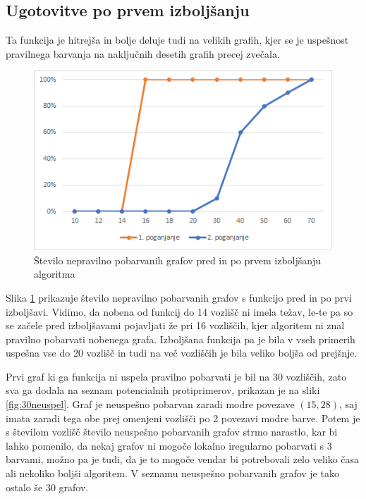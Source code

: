 \documentclass[12pt, a4paper]{article}
\begin{document}
\subsection{Ugotovitve po prvem izboljšanju}

Ta funkcija je hitrejša in bolje deluje tudi na velikih grafih, kjer se je uspešnost pravilnega barvanja na naključnih desetih grafih precej zvečala.

\begin{figure}[H]
  \includegraphics[width=\linewidth]{stevilo_nepravilnih.png}
  \caption{Število nepravilno pobarvanih grafov pred in po prvem izboljšanju algoritma}
  \label{fig:stnepravilnih1}
\end{figure}

Slika \ref{fig:stnepravilnih1} prikazuje število nepravilno pobarvanih grafov s funkcijo pred in po prvi izboljšavi. Vidimo, da nobena od funkcij do 14 vozlišč ni imela težav, le-te pa so se začele pred izboljšavami pojavljati že pri 16 vozliščih, kjer algoritem ni znal pravilno pobarvati nobenega grafa. Izboljšana funkcija pa je bila v vseh primerih uspešna vse do 20 vozlišč in tudi na več vozliščih je bila veliko boljša od prejšnje.

Prvi graf ki ga funkcija ni uspela pravilno pobarvati je bil na 30 vozliščih, zato sva ga dodala na seznam potencialnih protiprimerov, prikazan je na sliki \ref{fig:30neuspel}. Graf je neuspešno pobarvan zaradi modre povezave $(15, 28)$, saj imata zaradi tega obe prej omenjeni vozlišči po 2 povezavi modre barve. Potem je s številom vozlišč  število neuspešno pobarvanih grafov strmo narastlo, kar bi lahko pomenilo, da nekaj grafov ni mogoče lokalno iregularno pobarvati s 3 barvami, možno pa je tudi, da je to mogoče vendar bi potrebovali zelo veliko časa ali nekoliko boljši algoritem. V seznamu neuspešno pobarvanih grafov je tako ostalo še 30 grafov.
\end{document}
